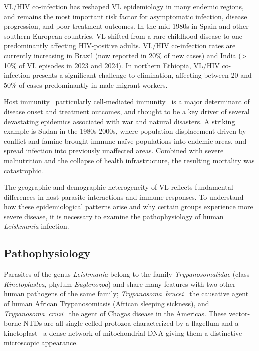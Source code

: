 VL/HIV co-infection has reshaped VL epidemiology in many endemic regions, and remains the most important risk factor for asymptomatic infection, disease progression, and poor treatment outcomes. In the mid-1980s in Spain and other southern European countries, VL shifted from a rare childhood disease to one predominantly affecting HIV-positive adults\cite{monge2014,alvar2008}. VL/HIV co-infection rates are currently increasing in Brazil (now reported in 20\% of new cases\cite{PAHO_Leishmaniasis_2024}) and India (> 10\% of VL episodes in 2023 and 2024\cite{NCVBDC2025}). In northern Ethiopia, VL/HIV co-infection presents a significant challenge to elimination, affecting between 20 and 50\% of cases predominantly in male migrant workers\cite{diro2014}.

Host immunity \textemdash\  particularly cell-mediated immunity \textemdash\  is a major determinant of disease onset and treatment outcomes, and thought to be a key driver of several devastating epidemics associated with war and natural disasters. A striking example is Sudan in the 1980s-2000s, where population displacement driven by conflict and famine brought immune-naïve populations into endemic areas, and spread infection into previously unaffected areas. Combined with severe malnutrition and the collapse of health infrastructure, the resulting mortality was catastrophic\cite{zijlstra1991, collin2004, al-salem2016}.

The geographic and demographic heterogeneity of VL reflects fundamental differences in host-parasite interactions and immune responses. To understand how these epidemiological patterns arise and why certain groups experience more severe disease, it is necessary to examine the pathophysiology of human \textit{Leishmania} infection.

\subsection{Pathophysiology}

Parasites of the genus \textit{Leishmania} belong to the family \textit{Trypanosomatidae} (class \textit{Kinetoplastea}, phylum \textit{Euglenozoa}) and share many features with two other human pathogens of the same family; \textit{Trypanosoma~brucei} \textemdash\ the causative agent of human African Trypanosomiasis (African sleeping sickness), and \textit{Trypanosoma~cruzi} \textemdash\  the agent of Chagas disease in the Americas. These vector-borne NTDs are all single-celled protozoa characterized by a flagellum and a kinetoplast \textemdash\  a dense network of mitochondrial DNA giving them a distinctive microscopic appearance.

